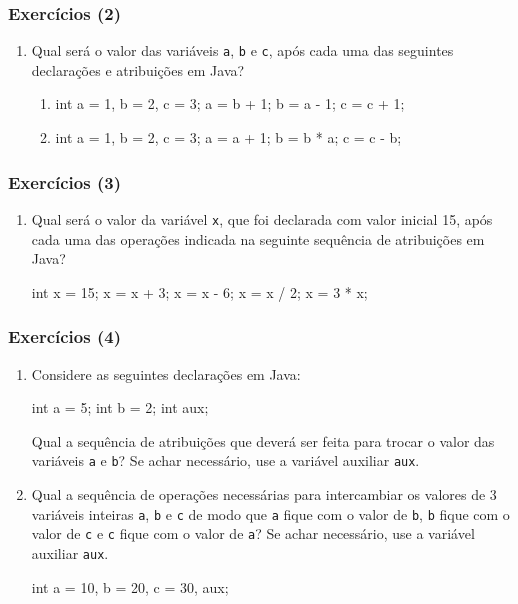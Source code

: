 \documentclass[xcolor={dvipsnames,table},aspectratio=169]{beamer}
\newcommand\setItemnumber[1]{\setcounter{enumi}{\numexpr#1-1\relax}}
\begin{document}
\begin{frame}[fragile]\frametitle{Exercícios (2)}
\begin{enumerate}
	\setItemnumber{2}
	\item Qual será o valor das variáveis \texttt{a}, \texttt{b} e \texttt{c}, após cada uma das seguintes declarações e atribuições em Java?
	\begin{enumerate}[a]
		\item
\begin{javacode}
int a = 1, b = 2, c = 3;
a = b + 1;
b = a - 1;
c = c + 1;
\end{javacode}
		\item
\begin{javacode}
int a = 1, b = 2, c = 3;
a = a + 1;
b = b * a;
c = c - b;
\end{javacode}
	\end{enumerate}
\end{enumerate}
\end{frame}

\begin{frame}[fragile]\frametitle{Exercícios (3)}
\begin{enumerate}
	\setItemnumber{3}
	\item Qual será o valor da variável \texttt{x}, que foi declarada com valor inicial 15, após cada uma das operações indicada na seguinte sequência de atribuições em Java?
\begin{javacode}
int x = 15;
x = x + 3;
x = x - 6;
x = x / 2;
x = 3 * x;
\end{javacode}
\end{enumerate}
\end{frame}

\begin{frame}[fragile]\frametitle{Exercícios (4)}
\begin{enumerate}
	\setItemnumber{4}
	\item Considere as seguintes declarações em Java:
\begin{javacode}
int a = 5;
int b = 2;
int aux;
\end{javacode}
Qual a sequência de atribuições que deverá ser feita para trocar o valor das variáveis \texttt{a} e \texttt{b}? Se achar necessário, use a variável auxiliar \texttt{aux}.
	\item Qual a sequência de operações necessárias para intercambiar os valores de 3 variáveis inteiras \texttt{a}, \texttt{b} e \texttt{c} de modo que \texttt{a} fique com o valor de \texttt{b}, \texttt{b} fique com o valor de \texttt{c} e \texttt{c} fique com o valor de \texttt{a}? Se achar necessário, use a variável auxiliar \texttt{aux}.
\begin{javacode}
int a = 10, b = 20, c = 30, aux;
\end{javacode}
\end{enumerate}
\end{frame}
\end{document}
